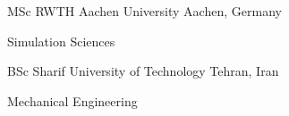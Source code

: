 

\begin{cventries}

  \cventry
    {MSc} %
    {RWTH Aachen University} %
    {Aachen, Germany} %
    {} %
    {
      \begin{cvitems} %
        \item {Simulation Sciences}
      \end{cvitems}
    }
    
  \cventry
    {BSc} %
    {Sharif University of Technology} %
    {Tehran, Iran} %
    {} %
    {
      \begin{cvitems} %
        \item {Mechanical Engineering}
      \end{cvitems}
    }

\end{cventries}
